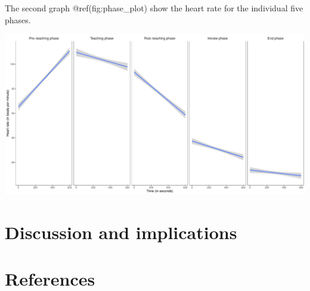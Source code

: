 \documentclass[
  man,floatsintext]{apa6}
\begin{document}
The second graph @ref(fig:phase\_plot) show the heart rate for the individual five phases.

\includegraphics{fitbit_paper_files/figure-latex/phase_plot-1.pdf}

\hypertarget{discussion-and-implications}{%
\section{Discussion and implications}\label{discussion-and-implications}}

\newpage

\hypertarget{references}{%
\section{References}\label{references}}
\end{document}
